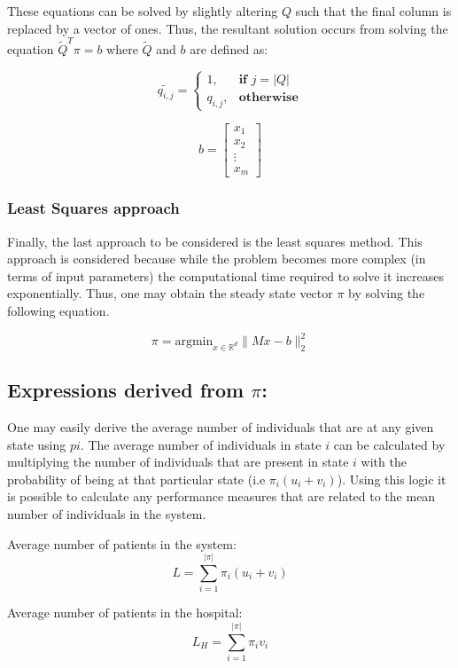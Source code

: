 These equations can be solved by slightly altering \( Q \) such that the final column is replaced by a vector of ones. Thus, the resultant solution occurs from solving the equation \( \tilde{Q}^T \pi = b \) where \( \tilde{Q} \) and \( b \) are defined as:

\[
\tilde{q_{i, j}} = 
\begin{cases}
    1, & \textbf{if } j = |Q| \\
    q_{i,j}, & \textbf{otherwise}
\end{cases}
\]

\[
b = 
\begin{bmatrix}
    x_{1} \\
    x_{2} \\
    \vdots \\
    x_{m}
\end{bmatrix}
\]


\subsubsection{Least Squares approach}
Finally, the last approach to be considered is the least squares method. This approach is considered because while the problem becomes more complex (in terms of input parameters) the computational time required to solve it increases exponentially. Thus, one may obtain the steady state vector \( \pi \) by solving the following equation.

\[
\pi = \text{argmin}_{x\in\mathbb{R}^{d}}\|Mx-b\|_2^2
\]

\newpage
\subsection{Expressions derived from \( \pi \):}
One may easily derive the average number of individuals that are at any given state using \( pi \). The average number of individuals in state \( i \) can be calculated by multiplying the number of individuals that are present in state \( i \) with the probability of being at that particular state (i.e \(\pi_i (u_i + v_i)\)). Using this logic it is possible to calculate any performance measures that are related to the mean number of individuals in the system.


Average number of patients in the system: 
\begin{equation}
    L = \sum_{i=1}^{|\pi|} \pi_i (u_i + v_i)
\end{equation} 

Average number of patients in the hospital: 
\begin{equation}
    L_H = \sum_{i=1}^{|\pi|} \pi_i v_i
\end{equation}

